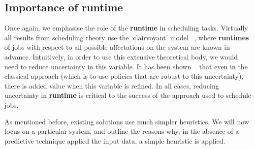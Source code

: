 \documentclass{article}
\begin{document}
\subsection{Importance of \textbf{runtime}}
\label{sub:importance_of_runtime}
Once again, we emphasise the role of the \textbf{runtime} in scheduling tasks. Virtually all results from scheduling theory use the `clairvoyant' model ~\cite{handbook-of-scheduling}, where \textbf{runtimes} of jobs with respect to all possible affectations on the system are known in advance.
Intuitively, in order to use this extensive theoretical body, we would need to reduce uncertainty in this variable.
It has been shown  ~\cite{tsafir} that even in the classical approach (which is to use policies that are robust to this uncertainty), there is added value when this variable is refined.
In all cases, reducing uncertainty in \textbf{runtime} is critical to the success of the approach used to schedule jobs.

As mentioned before, existing solutions use much simpler heuristics. We will now focus on a particular system, and outline the reasons why, in the absence of a predictive technique applied the input data, a simple heuristic is applied.
\end{document}
